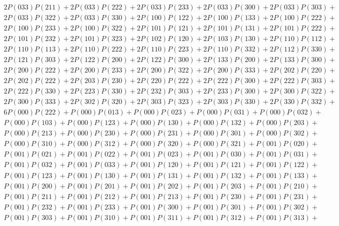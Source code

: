\documentclass{article}
\theoremstyle{definition}
\begin{document}
\begin{gather*}
        2P(033)P(211) + 2P(033)P(222) + 2P(033)P(233) + 2P(033)P(300) + 2P(033)P(303) +\\
        2P(033)P(322) + 2P(033)P(330) + 2P(100)P(122) + 2P(100)P(133) + 2P(100)P(222) +\\
        2P(100)P(233) + 2P(100)P(322) + 2P(101)P(121) + 2P(101)P(131) + 2P(101)P(222) +\\
        2P(101)P(232) + 2P(101)P(323) + 2P(102)P(120) + 2P(103)P(130) + 2P(110)P(112) +\\
        2P(110)P(113) + 2P(110)P(222) + 2P(110)P(223) + 2P(110)P(332) + 2P(112)P(330) +\\
        2P(121)P(303) + 2P(122)P(200) + 2P(122)P(300) + 2P(133)P(200) + 2P(133)P(300) +\\
        2P(200)P(222) + 2P(200)P(233) + 2P(200)P(322) + 2P(200)P(333) + 2P(202)P(220) +\\
        2P(202)P(222) + 2P(203)P(230) + 2P(220)P(222) + 2P(222)P(300) + 2P(222)P(303) +\\
        2P(222)P(330) + 2P(223)P(330) + 2P(232)P(303) + 2P(233)P(300) + 2P(300)P(322) +\\
        2P(300)P(333) + 2P(302)P(320) + 2P(303)P(323) + 2P(303)P(330) + 2P(330)P(332) +\\
        6P(000)P(222) + P(000)P(013) + P(000)P(023) + P(000)P(031) + P(000)P(032) +\\
        P(000)P(103) + P(000)P(123) + P(000)P(130) + P(000)P(132) + P(000)P(203) +\\
        P(000)P(213) + P(000)P(230) + P(000)P(231) + P(000)P(301) + P(000)P(302) +\\
        P(000)P(310) + P(000)P(312) + P(000)P(320) + P(000)P(321) + P(001)P(020) +\\
        P(001)P(021) + P(001)P(022) + P(001)P(023) + P(001)P(030) + P(001)P(031) +\\
        P(001)P(032) + P(001)P(033) + P(001)P(120) + P(001)P(121) + P(001)P(122) +\\
        P(001)P(123) + P(001)P(130) + P(001)P(131) + P(001)P(132) + P(001)P(133) +\\
        P(001)P(200) + P(001)P(201) + P(001)P(202) + P(001)P(203) + P(001)P(210) +\\
        P(001)P(211) + P(001)P(212) + P(001)P(213) + P(001)P(230) + P(001)P(231) +\\
        P(001)P(232) + P(001)P(233) + P(001)P(300) + P(001)P(301) + P(001)P(302) +\\
        P(001)P(303) + P(001)P(310) + P(001)P(311) + P(001)P(312) + P(001)P(313) +\\

\end{gather*}
\end{document}
